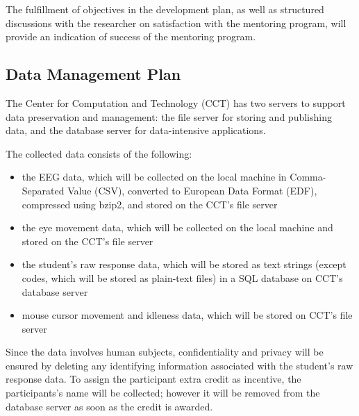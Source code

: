 \documentclass[hidelinks,11pt]{article}
\begin{document}
The fulfillment of objectives in the development plan, as well as structured
discussions with the researcher on satisfaction with the mentoring program,
will provide an indication of success of the mentoring program. 

\pagebreak
\subsection{ Data Management Plan  }

The Center for Computation and Technology (CCT) has two servers to support
data preservation and management: the file server for storing and publishing
data, and the database server for data-intensive applications.

The collected data consists of the following:

\begin{itemize}

\item the EEG data, which will be collected on the local machine in
Comma-Separated Value (CSV), converted to European Data Format (EDF),
compressed using bzip2, and stored on the CCT's file server

\item the eye movement data, which will be collected on the local machine and
stored on the CCT's file server

\item the student's raw response data, which will be stored as text strings
(except codes, which will be stored as plain-text files) in a SQL database
on CCT's database server

\item mouse cursor movement and idleness data, which will be stored
on CCT's file server

\end{itemize}


Since the data involves human subjects, confidentiality and privacy will be
ensured by deleting any identifying information associated with the student's
raw response data.  To assign the participant extra credit as incentive, the
participants's name will be collected; however it will be removed from the
database server as soon as the credit is awarded. 
\end{document}
